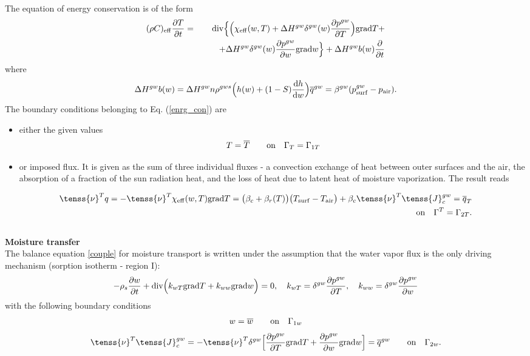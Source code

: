 The equation of energy conservation is of the form
\begin{eqnarray}\label{enrg_con}
( \rho C)_{\rm eff} \frac{\partial T}{\partial t} &=& {\rm div} \Big\{ \Big(\chi_{\rm eff} (w, 
T) +  \Delta H^{gw} \delta^{gw}(w) \frac{\partial p^{gw}}{\partial T} \Big) {\rm grad} T +\\
&& \qquad  +\Delta H^{gw} \delta^{gw}(w) \frac{\partial p^{gw}}{\partial w} {\rm grad} w \Big\} +  \Delta H^{gw} b(w) 
\frac{\partial}{\partial t}\nonumber
\end{eqnarray}
where
\begin{eqnarray}
 \Delta H^{gw} b(w) =  \Delta H^{gw} n \rho^{gws} \Big( h(w) + (1-S)\frac{{\rm d} h}{{\rm d} w}\Big )
\overline{q}^{gw} = \beta^{gw} (p_{\rm surf}^{gw} - p_{\rm air}).
\end{eqnarray}
The boundary conditions belonging to Eq. (\ref{enrg_con}) are
\begin{itemize}
\item{either the given values}
\begin{eqnarray}
T = \overline{T} \qquad {\rm on} \quad \Gamma_{T} = \Gamma_{1 T}
\end{eqnarray}
\item{or imposed flux. It is given as the sum of three individual fluxes - a convection exchange 
of heat between outer surfaces and the air, the absorption of a fraction of the sun radiation 
heat, and the loss of heat due to latent heat of moisture vaporization. The result reads}
\end{itemize}
\begin{eqnarray}
\tenss{\nu}^T q = - \tenss{\nu}^T \chi_{\rm eff}(w,T) {\rm grad} T  = 
\big(\beta_c + \beta_r(T)\big) \big(T_{\rm surf} - T_{\rm air}\big) + \beta_c \tenss{\nu}^T 
\tenss{J}_c^{gw}= \overline{q}_{T}\nonumber\\
{\rm on} \quad \Gamma^{T} = \Gamma_{2 T}.
\end{eqnarray}\\

{\bf Moisture transfer}\\

The balance equation \eqref{couple} for moisture transport is written under the assumption 
that the water vapor flux is the only driving mechanism (sorption isotherm - region I):
\begin{eqnarray}\label{dif}
-\rho_s \frac{\partial w}{\partial t} + {\rm div} \Big(k_{w T} {\rm grad} T +
k_{w w} {\rm grad} w \Big) = 0, \quad k_{w T} = \delta^{gw}  \frac{\partial p^{gw}}
{\partial T}, \quad k_{w w} = \delta^{gw} \frac{\partial p^{gw}}{\partial w}
\end{eqnarray}
with the following boundary conditions
\begin{eqnarray}
w =\overline{w} \qquad {\rm on} \quad \Gamma_{1w} \nonumber
\end{eqnarray}
\begin{eqnarray}\label{bound}
\tenss{\nu}^T \tenss{J}_c^{gw} = 
- \tenss{\nu}^T {\delta}^{gw} \Big[ \frac{\partial p^{gw}}{\partial T} 
{\rm grad} T + \frac{\partial p^{gw}}{\partial w} 
{\rm grad} w \Big]= \overline{q}^{gw}
 \qquad {\rm on} \quad \Gamma_{2w}.
\end{eqnarray}

